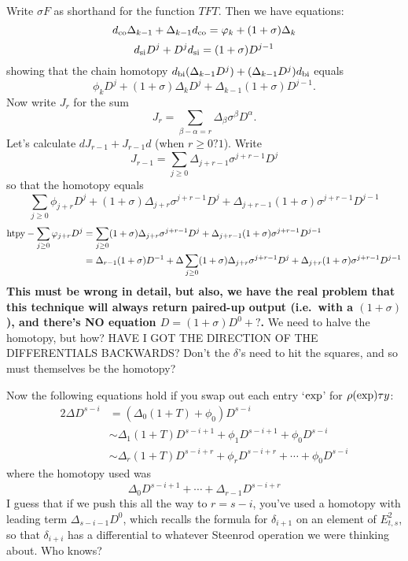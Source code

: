 \documentclass[10pt]{article}
\newcommand{\twist}{\sigma}
\begin{document}
\begin{Adams sseq operations old version}
Write $\twist F$ as shorthand for the function $TFT$. Then we have equations:
\[d_\textup{co}\Delta_{k-1}+\Delta_{k-1}d_\textup{co}= \phi_{k}+(1+\twist)\Delta_{k}\]
\[d_\textup{si}D^{j}+D^{j}d_\textup{si}=(1+\twist)D^{j-1}\]
showing that the chain homotopy $d_\textup{bi}(\Delta_{k-1}D^{j})+(\Delta_{k-1}D^{j}) d_\textup{bi}$ equals
\[\phi_{k}D^{j}+(1+\twist)\Delta_{k}D^{j}+\Delta_{k-1}(1+\twist)D^{j-1}.\]
Now write $J_r$ for the sum
\[J_r=\sum_{\beta-\alpha=r}\Delta_\beta\twist^\beta D^\alpha.\]
Let's calculate $dJ_{r-1}+J_{r-1}d$ (when $r\geq0\textbf{?}1$). Write
\[J_{r-1}=\sum_{j\geq0}\Delta_{j+r-1}\twist^{j+r-1}D^{j}\]
so that the homotopy equals
\[\sum_{j\geq0}\phi_{j+r}D^{j}+ (1+\twist)\Delta_{j+r}\twist^{j+r-1}D^{j}+\Delta_{j+r-1}(1+\twist)\twist^{j+r-1}D^{j-1}\]
\begin{alignat*}{2}
\textup{htpy}-\sum_{j\geq0}\phi_{j+r}D^{j}
&=
\sum_{j\geq0}(1+\twist)\Delta_{j+r}\twist^{j+r-1}D^{j}+\Delta_{j+r-1}(1+\twist)\twist^{j+r-1}D^{j-1}%
\\
&=
\Delta_{r-1}(1+\twist)D^{-1}+\Delta\sum_{j\geq0}(1+\twist)\Delta_{j+r}\twist^{j+r-1}D^{j}+\Delta_{j+r}(1+\twist)\twist^{j+r-1}D^{j-1}%
\end{alignat*}
\textbf{This must be wrong in detail, but also, we have the real problem that this technique will always return paired-up output (i.e.\ with a $(1+\twist)$), and there's NO equation $D=(1+\twist)D^0+?$.} We need to halve the homotopy, but how? HAVE I GOT THE DIRECTION OF THE DIFFERENTIALS BACKWARDS? Don't the $\delta$'s need to hit the squares, and so must themselves be the homotopy?

Now the following equations hold if you swap out each entry `$\textup{exp}$' for $\rho(\textup{exp})\tau y$:
\begin{alignat*}{2}
\Delta D^{s-i}
&=
(\Delta_0(1+T)+\phi_0)D^{s-i}%
\\
&\sim
\Delta_1(1+T)D^{s-i+1}+\phi_1D^{s-i+1}+\phi_0D^{s-i}%
\\
&\sim
\Delta_r(1+T)D^{s-i+r}+\phi_rD^{s-i+r}+\cdots+\phi_0D^{s-i}%
\end{alignat*}
where the homotopy used was
\[\Delta_0D^{s-i+1}+\cdots +\Delta_{r-1}D^{s-i+r}\]
I guess that if we push this all the way to $r=s-i$, you've used a homotopy with leading term $\Delta_{s-i-1}D^0$, which recalls the formula for $\delta_{i+1}$ on an element of $E^2_{t,s}$, so that $\delta_{i+i}$ has a differential to whatever Steenrod operation we were thinking about. Who knows?


\end{Adams sseq operations old version}
\end{document}
